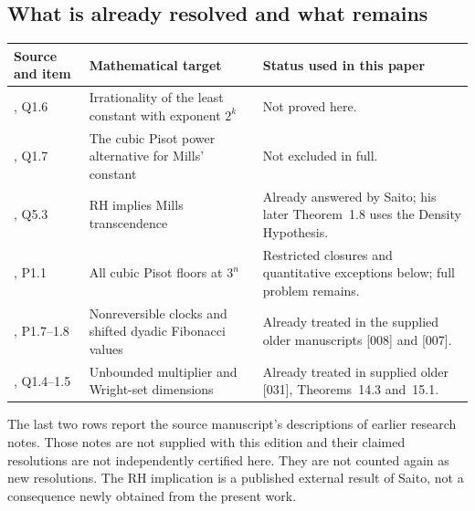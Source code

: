 \documentclass[11pt,a4paper]{article}
\theoremstyle{definition}\newtheorem{definition}[theorem]{Definition}
\theoremstyle{remark}\newtheorem{remark}[theorem]{Remark}
\begin{document}
\subsection{What is already resolved and what remains}
\begin{center}\small
\begin{tabular}{p{}p{}p{}}
\toprule
Source and item & Mathematical target & Status used in this paper\\
\midrule
\cite{SaitoIrrational}, Q1.6 & Irrationality of the least constant with exponent $2^k$ & Not proved here.\\
\cite{SaitoIrrational}, Q1.7 & The cubic Pisot power alternative for Mills' constant & Not excluded in full.\\
\cite{SaitoIrrational}, Q5.3 & RH implies Mills transcendence & Already answered by Saito; his later Theorem~1.8 uses the Density Hypothesis.\\
\cite{SaitoIntervals}, P1.1 & All cubic Pisot floors at $3^n$ & Restricted closures and quantitative exceptions below; full problem remains.\\
\cite{SaitoIntervals}, P1.7--1.8 & Nonreversible clocks and shifted dyadic Fibonacci values & Already treated in the supplied older manuscripts [008] and [007].\\
\cite{SaitoDimension}, Q1.4--1.5 & Unbounded multiplier and Wright-set dimensions & Already treated in supplied older [031], Theorems~14.3 and~15.1.\\
\bottomrule
\end{tabular}
\end{center}
The last two rows report the source manuscript's descriptions of earlier
research notes. Those notes are not supplied with this edition and their
claimed resolutions are not independently certified here. They are not counted again as new resolutions.
The RH implication is a published external result of Saito, not a
consequence newly obtained from the present work.
\end{document}
